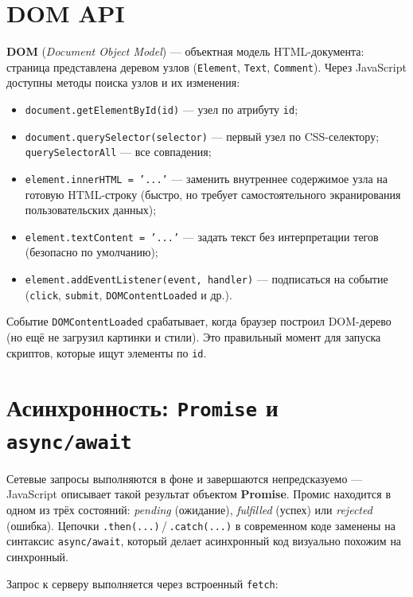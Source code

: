 \section{DOM API}

\textbf{DOM} (\textit{Document Object Model}) --- объектная модель
HTML-документа: страница представлена деревом узлов
(\texttt{Element}, \texttt{Text}, \texttt{Comment}). Через JavaScript
доступны методы поиска узлов и их изменения:

\begin{itemize}
  \item \texttt{document.getElementById(id)} --- узел по атрибуту
        \texttt{id};
  \item \texttt{document.querySelector(selector)} --- первый узел по
        CSS-селектору; \texttt{querySelectorAll} --- все совпадения;
  \item \texttt{element.innerHTML = '...'} --- заменить внутреннее
        содержимое узла на готовую HTML-строку (быстро, но требует
        самостоятельного экранирования пользовательских данных);
  \item \texttt{element.textContent = '...'} --- задать текст без
        интерпретации тегов (безопасно по умолчанию);
  \item \texttt{element.addEventListener(event, handler)} ---
        подписаться на событие (\texttt{click}, \texttt{submit},
        \texttt{DOMContentLoaded} и др.).
\end{itemize}

Событие \texttt{DOMContentLoaded} срабатывает, когда браузер построил
DOM-дерево (но ещё не загрузил картинки и стили). Это правильный
момент для запуска скриптов, которые ищут элементы по \texttt{id}.

\section{Асинхронность: \texttt{Promise} и \texttt{async/await}}

Сетевые запросы выполняются в фоне и завершаются непредсказуемо ---
JavaScript описывает такой результат объектом \textbf{Promise}.
Промис находится в одном из трёх состояний: \textit{pending} (ожидание),
\textit{fulfilled} (успех) или \textit{rejected} (ошибка). Цепочки
\texttt{.then(...)}\,/\,\texttt{.catch(...)} в современном коде заменены
на синтаксис \texttt{async/await}, который делает асинхронный код
визуально похожим на синхронный.

Запрос к серверу выполняется через встроенный \texttt{fetch}:

